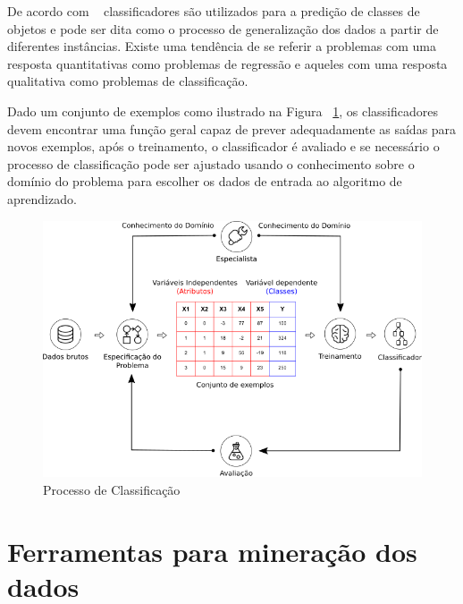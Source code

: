 De acordo com ~\cite{porthos_motta:2016} classificadores são utilizados para a predição de classes de objetos e pode ser dita como o processo de generalização dos dados a partir de diferentes instâncias. Existe uma tendência de se referir a problemas com uma resposta quantitativas como problemas de regressão e aqueles com uma resposta qualitativa como problemas de classificação.

Dado um conjunto de exemplos como ilustrado na Figura ~\ref{fig:processo_classificacao}, os classificadores devem encontrar uma função geral capaz de prever adequadamente as saídas para novos exemplos, após o treinamento, o classificador é avaliado e se necessário o processo de classificação pode ser ajustado usando o conhecimento sobre o domínio do problema para escolher os dados de entrada ao algoritmo de aprendizado. 


\begin{figure}[H]
\begin{center}
    \includegraphics[scale=0.75]{figuras/processo_classificacao.png}
\end{center}
\caption{Processo de Classificação}
\label{fig:processo_classificacao}
\end{figure}


\section{Ferramentas para mineração dos dados}



